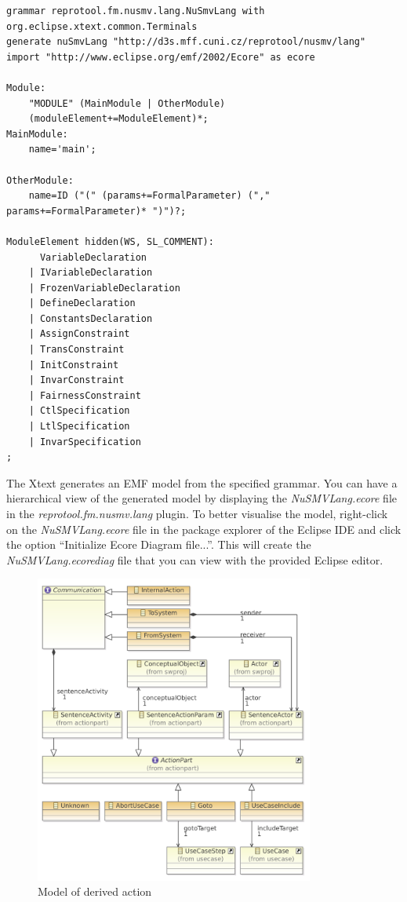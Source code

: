 \begin{lstlisting}[language=XtextGrammar]
grammar reprotool.fm.nusmv.lang.NuSmvLang with org.eclipse.xtext.common.Terminals
generate nuSmvLang "http://d3s.mff.cuni.cz/reprotool/nusmv/lang"
import "http://www.eclipse.org/emf/2002/Ecore" as ecore

Module:
	"MODULE" (MainModule | OtherModule)
	(moduleElement+=ModuleElement)*;
MainModule:
	name='main';

OtherModule:
	name=ID ("(" (params+=FormalParameter) ("," params+=FormalParameter)* ")")?;

ModuleElement hidden(WS, SL_COMMENT):
	  VariableDeclaration
	| IVariableDeclaration
	| FrozenVariableDeclaration
	| DefineDeclaration
	| ConstantsDeclaration
	| AssignConstraint
	| TransConstraint
	| InitConstraint
	| InvarConstraint
	| FairnessConstraint
	| CtlSpecification
	| LtlSpecification
	| InvarSpecification
;
\end{lstlisting}

The Xtext generates an EMF model from the specified grammar. You can have a hierarchical view of the generated model by displaying the
\emph{NuSMVLang.ecore} file in the \emph{reprotool.fm.nusmv.lang} plugin. To better visualise the model, right-click on the \emph{NuSMVLang.ecore} file in
the package explorer of the Eclipse IDE and click the option ``Initialize Ecore Diagram file...''. This will create the \emph{NuSMVLang.ecorediag} file that you can view with the provided Eclipse editor.

\begin{figure}[ht]
  \centering
  \includegraphics[width=260pt]{images/ReprotoolActionsModel}
  \caption{Model of derived action}
  \label{fig:ReprotoolActionsModel_}
\end{figure}

